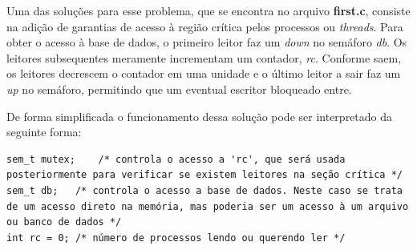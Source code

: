	
	Uma das soluções para esse problema, que se encontra no arquivo \textbf{first.c}, consiste na adição de garantias de acesso à região crítica pelos processos ou \textit{threads}. Para obter o acesso à base de dados, o primeiro leitor faz um \textit{down} no semáforo \textit{db}. Os leitores subsequentes meramente incrementam um contador, \textit{rc}. Conforme saem, os leitores decrescem o contador em uma unidade e o último leitor a sair faz um \textit{up} no semáforo, permitindo que um eventual escritor bloqueado entre.
	
	De forma simplificada o funcionamento dessa solução pode ser interpretado da seguinte forma:
	\begin{lstlisting}[style=C]
sem_t mutex;	/* controla o acesso a 'rc', que será usada posteriormente para verificar se existem leitores na seção crítica */
sem_t db;	/* controla o acesso a base de dados. Neste caso se trata de um acesso direto na memória, mas poderia ser um acesso à um arquivo ou banco de dados */
int rc = 0;	/* número de processos lendo ou querendo ler */
	\end{lstlisting}
	

